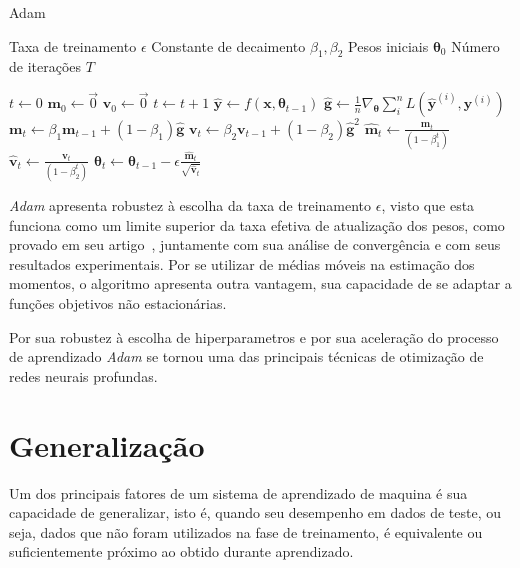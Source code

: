 \begin{algorithm}
    \caption{Adam}
    \label{al:adam}
    \begin{algorithmic}
        \Require Taxa de treinamento $\epsilon$
        \Require Constante de decaimento $\beta_{1}, \beta_{2}$
        \Require Pesos iniciais $\boldsymbol{\theta}_{0}$
        \Require Número de iterações $T$

        \State $t \gets 0$
        \State $\mathbf{m}_{0} \gets \vec{0}$
        \State $\mathbf{v}_{0} \gets \vec{0}$
            \State $t \gets t + 1$
            \State $\mathbf{\hat{y}} \gets f(\mathbf{x}, \boldsymbol{\theta}_{t-1})$
            \State $\mathbf{\hat{g}} \gets \frac{1}{n} \nabla_{\boldsymbol{\theta}} \sum_i^n L(\mathbf{\hat{y}}^{(i)}, \mathbf{y}^{(i)})$
            \State $\mathbf{m}_{t} \gets \beta_{1} \mathbf{m}_{t-1} + (1 - \beta_{1}) \mathbf{\hat{g}}$
            \State $\mathbf{v}_{t} \gets \beta_{2} \mathbf{v}_{t-1} + (1 - \beta_{2}) \mathbf{\hat{g}}^{2}$
            \State $\mathbf{\hat{m}}_{t} \gets \frac{\mathbf{m}_{t}}{(1 - \beta_{1}^{t})}$
            \State $\mathbf{\hat{v}}_{t} \gets \frac{\mathbf{v}_{t}}{(1 - \beta_{2}^{t})}$
            \State $\boldsymbol{\theta}_{t} \gets \boldsymbol{\theta}_{t-1} - \epsilon \frac{\mathbf{\hat{m}}_{t}}{\sqrt{\mathbf{\hat{v}}_{t}}} $
        \EndWhile
    \end{algorithmic}
\end{algorithm}

\textit{Adam} apresenta robustez à escolha da taxa de treinamento $\epsilon$, visto que esta funciona como um limite superior da taxa efetiva de atualização dos pesos, como provado em seu artigo~\cite{kingma14}, juntamente com sua análise de convergência e com seus resultados experimentais. Por se utilizar de médias móveis na estimação dos momentos, o algoritmo apresenta outra vantagem, sua capacidade de se adaptar a funções objetivos não estacionárias.

Por sua robustez à escolha de hiperparametros e por sua aceleração do processo de aprendizado \textit{Adam} se tornou uma das principais técnicas de otimização de redes neurais profundas.

\section{Generalização} \label{sec:generalizacao}

Um dos principais fatores de um sistema de aprendizado de maquina é sua capacidade de generalizar, isto é, quando seu desempenho em dados de teste, ou seja, dados que não foram utilizados na fase de treinamento, é equivalente ou suficientemente próximo ao obtido durante aprendizado.

